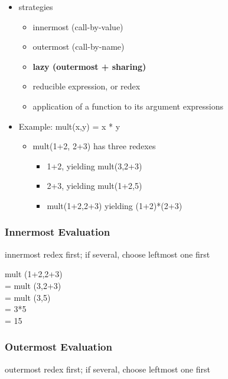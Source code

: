 \begin{itemize}
\tightlist
\item
  strategies

  \begin{itemize}
  \tightlist
  \item
    innermost (call-by-value)
  \item
    outermost (call-by-name)
  \item
    \textbf{lazy (outermost + sharing)}
  \item
    reducible expression, or redex
  \item
    application of a function to its argument expressions
  \end{itemize}
\item
  Example: mult(x,y) = x * y

  \begin{itemize}
  \tightlist
  \item
    mult(1+2, 2+3) has three redexes

    \begin{itemize}
    \tightlist
    \item
      1+2, yielding mult(3,2+3)
    \item
      2+3, yielding mult(1+2,5)
    \item
      mult(1+2,2+3) yielding (1+2)*(2+3)
    \end{itemize}
  \end{itemize}
\end{itemize}

\hypertarget{innermost-evaluation}{%
\subsubsection{Innermost Evaluation}\label{innermost-evaluation}}

innermost redex first; if several, choose leftmost one first

mult (1+2,2+3)\\
= mult (3,2+3)\\
= mult (3,5)\\
= 3*5\\
= 15

\clearpage
\hypertarget{outermost-evaluation}{%
\subsubsection{Outermost Evaluation}\label{outermost-evaluation}}

outermost redex first; if several, choose leftmost one first

